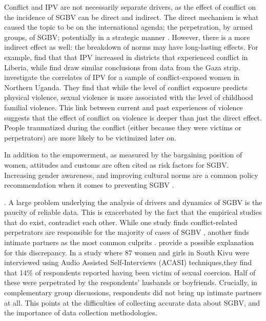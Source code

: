 \documentclass[10pt,a4paper]{scrartcl} %
\begin{document}
Conflict and IPV are not necessarily separate drivers, as the effect of conflict on the incidence of SGBV can be direct and indirect. The direct mechanism is what caused the topic to be on the international agenda; the perpetration, by armed groups, of SGBV; potentially in a strategic manner \citep{Baaz2013,Kirby2015}. However, there is a more indirect effect as well: the breakdown of norms may have long-lasting effects. For example, \cite{Kelly2018} find that that IPV increased in districts that experienced conflict in Liberia, while \cite{Muller2019} find draw similar conclusions from data from the Gaza strip. \cite{Saile2013} investigate the correlates of IPV for a sample of conflict-exposed women in Northern Uganda. They find that while the level of conflict exposure predicts physical violence, sexual violence is more associated with the level of childhood familial violence. This link between current and past experiences of violence suggests that the effect of conflict on violence is deeper than just the direct effect. People traumatized during the conflict (either because they were victims or perpetrators) are more likely to be victimized later on. 

In addition to the empowerment, as measured by the bargaining position of women, attitudes and customs are often cited as risk factors for SGBV. Increasing gender awareness, and improving cultural norms are a common policy recommendation when it comes to preventing SGBV \cite[e.g.][]{Quattrochi2019,Bueno2017}.


.
A large problem underlying the analysis of drivers and dynamics of SGBV is the paucity of reliable data. This is exacerbated by the fact that the empirical studies that do exist, contradict each other. While one study finds conflict-related perpetrators are responsible for the majority of cases of SGBV \citep{Johnson2010}, another finds intimate partners as the most common culprits \citep{Peterman2011}. \citet{Stark2017} provide a possible explanation for this discrepancy. In a study where 87 women and girls in South Kivu were interviewed using Audio Assisted Self-Interviews (ACASI) techniques,they find that 14\% of respondents reported having been victim of sexual coercion. Half of these were perpetrated by the respondents' husbands or boyfriends. Crucially, in complementary group discussions, respondents did not bring up intimate partners at all. This points at the difficulties of collecting accurate data about SGBV, and the importance of data collection methodologies. 
\end{document}
